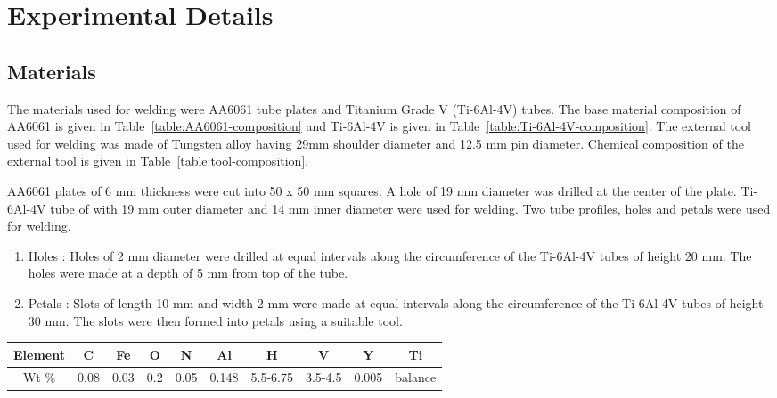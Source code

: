 \documentclass[3p]{elsarticle}
\begin{document}

\section{Experimental Details} 
\label{sec:Experimental Details}
\subsection{Materials}
\label{subsec:Materials}
The materials used for welding were AA6061 tube plates and Titanium Grade V (Ti-6Al-4V) tubes. The base material composition of AA6061 is given in Table~\ref{table:AA6061-composition} and Ti-6Al-4V is given in Table~\ref{table:Ti-6Al-4V-composition}. The external tool used for welding was made of Tungsten alloy having 29mm shoulder diameter and 12.5 mm pin diameter. Chemical composition of the external tool is given in Table~\ref{table:tool-composition}. 
\par 
AA6061 plates of 6 mm thickness were cut into 50 x 50 mm squares. A hole of 19 mm diameter was drilled at the center of the plate. Ti-6Al-4V tube of with 19 mm outer diameter and 14 mm inner diameter were used for welding. Two tube profiles, holes and petals were used for welding.
\begin{enumerate}[1.]
\item Holes : Holes of 2 mm diameter were drilled at equal intervals along the circumference of the Ti-6Al-4V tubes of height 20 mm. The holes were made at a depth of 5 mm from top of the tube.
\item Petals : Slots of length 10 mm and width 2 mm were made at equal intervals along the circumference of the Ti-6Al-4V tubes of height 30 mm. The slots were then formed into petals using a suitable tool.
\end{enumerate}

\begin{table*}[!htbp]
\caption{CHEMICAL COMPOSITION OF Ti-6Al-4V}
\centering
\begin{tabular}{|c|c|c|c|c|c|c|c|c|c|}
\hline 
Element & C & Fe & O & N & Al & H & V & Y & Ti\\ 
\hline 
Wt \% & 0.08 & 0.03 & 0.2 & 0.05 & 0.148 & 5.5-6.75 & 3.5-4.5 & 0.005 & balance\\ 
\hline 
\end{tabular}
\label{table:Ti-6Al-4V-composition} %
\end{table*}
\end{document}
